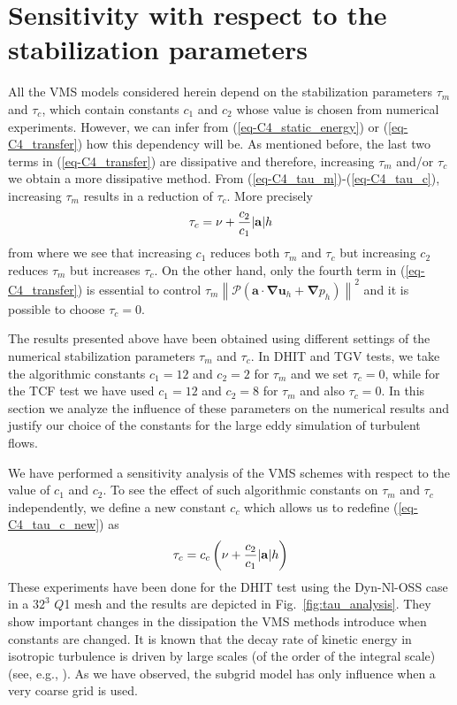 \section{Sensitivity with respect to the stabilization parameters}
\label{sec-C4_effect_const}

All the VMS models considered herein depend on the stabilization parameters $\tau_m$ and $\tau_c$, which contain constants $c_1$ and $c_2$ whose value is chosen from numerical experiments. However, we can infer from (\ref{eq-C4_static_energy}) or (\ref{eq-C4_transfer}) how this dependency will be. As mentioned before, the last two terms in (\ref{eq-C4_transfer}) are dissipative and therefore, increasing $\tau_m$ and/or $\tau_c$ we obtain a more dissipative method. From (\ref{eq-C4_tau_m})-(\ref{eq-C4_tau_c}), increasing $\tau_m$ results in a reduction of $\tau_c$. More precisely 
\begin{equation}
\label{eq-C4_tau_c_new}
\tau_c=\nu + \frac{c_2}{c_1}{|{\bf a}|}{h}
\end{equation}
from where we see that increasing $c_1$ reduces both $\tau_m$ and $\tau_c$ but increasing $c_2$ reduces $\tau_m$ but increases $\tau_c$. On the other hand, only the fourth term in (\ref{eq-C4_transfer}) is essential to control
$ \tau_{m} \left\| \mathcal{P} \left( \mathbf{a}\cdot \mathbf{\nabla u}_{h}+\mathbf{\nabla }p_{h}\right) \right\|^{2} $ and it is possible to choose $\tau_c=0$. 

The results presented above have been obtained using different settings of the numerical stabilization parameters $\tau_m$ and $\tau_c$. In DHIT and TGV tests, we take the algorithmic constants $c_1=12$ and $c_2=2$ for $\tau_m$ and we set $\tau_c=0$, while for the TCF test we have used $c_1=12$ and $c_2=8$ for $\tau_m$ and also $\tau_c=0$. In this section we analyze the influence of these parameters on the numerical results and justify our choice of the constants for the large eddy simulation of turbulent flows.

We have performed a sensitivity analysis of the VMS schemes with respect to the value of $c_1$ and $c_2$. To see the effect of such algorithmic constants on $\tau_m$ and $\tau_c$ independently, we define a new constant $c_c$ which allows us to redefine (\ref{eq-C4_tau_c_new}) as
\begin{equation}
\label{eq-C4_tau_c_cc_new}
\tau_c=c_c\left(\nu + \frac{c_2}{c_1}{|{\bf a}|}{h}\right)
\end{equation}
These experiments have been done for the DHIT test using the Dyn-Nl-OSS case in a $32^3$ $Q$1 mesh and the results are depicted in Fig.~\ref{fig:tau_analysis}. They show important changes in the dissipation the VMS methods introduce when constants are changed. %
It is known that the decay rate of kinetic energy in isotropic turbulence is driven by large scales (of the order of the integral scale) (see, e.g., \cite{comte-bellot_simple_1971}). As we have observed, the subgrid model has only influence when a very coarse grid is used.

